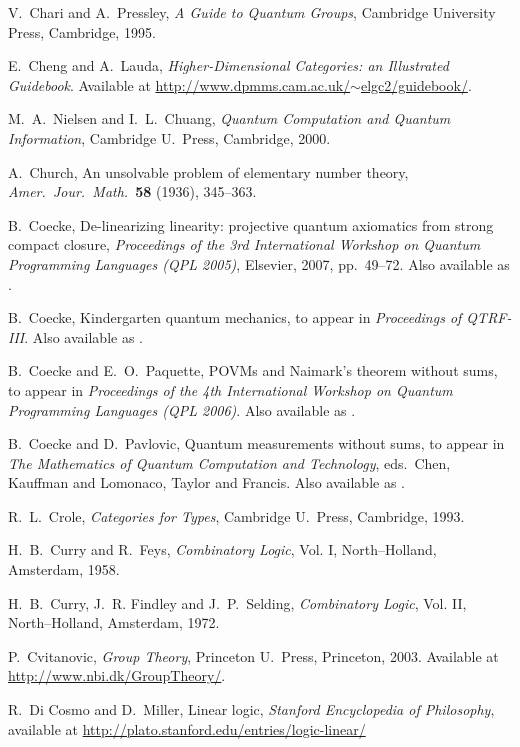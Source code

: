 \documentclass[12pt]{article}
\begin{document}
\begin{thebibliography}{99}
 V.\ Chari and A.\ Pressley, \textsl{A Guide to 
Quantum Groups}, Cambridge University Press, Cambridge, 1995.

 E.\ Cheng and A.\ Lauda, \textsl{Higher-Dimensional
Categories: an Illustrated Guidebook}.  Available at
\href{http://www.dpmms.cam.ac.uk/~elgc2/guidebook/}
{http://www.dpmms.cam.ac.uk/$\sim$elgc2/guidebook/}.

 M.\ A.\ Nielsen and I.\ L.\ Chuang,
{\sl Quantum Computation and Quantum Information}, Cambridge U.\ 
Press, Cambridge, 2000.
 
 A.\ Church, An unsolvable problem of elementary
number theory, {\sl Amer.\ Jour.\ Math.\ }{\bf 58} (1936), 345--363.

 B.\ Coecke, De-linearizing linearity: projective 
quantum axiomatics from strong compact closure, {\sl Proceedings of 
the 3rd International Workshop on Quantum Programming Languages (QPL 2005)}, 
Elsevier, 2007, pp.\ 49--72.  Also available as \quantph{0506134}.

 B.\ Coecke, Kindergarten quantum mechanics, to
appear in {\sl Proceedings of QTRF-III}.  Also available as
.

 B.\ Coecke and E.\ O.\ Paquette, POVMs and Naimark's
theorem without sums, to appear in {\sl Proceedings of the 4th
International Workshop on Quantum Programming Languages (QPL 2006)}.  
Also available as \quantph{0608072}.

 B.\ Coecke and D.\ Pavlovic, Quantum measurements without 
sums, to appear in {\sl The Mathematics of Quantum Computation and 
Technology}, eds.\ Chen, Kauffman and Lomonaco, Taylor and Francis.
Also available as \quantph{0608035}.

 R.\ L.\ Crole, {\sl Categories for Types}, Cambridge
U.\ Press, Cambridge, 1993.

 H.\ B.\ Curry and R.\ Feys, {\sl Combinatory Logic},
Vol. I, North--Holland, Amsterdam, 1958.

H.\ B.\ Curry, J.\ R. Findley and J.\ P.\ Selding, {\sl Combinatory
Logic}, Vol. II, North--Holland, Amsterdam, 1972.

 P.\ Cvitanovic, \textsl{Group Theory}, Princeton
U.\ Press, Princeton, 2003.  Available at \hfill \break
\href{http://www.nbi.dk/GroupTheory/}{
http://www.nbi.dk/GroupTheory/}.

 R.\ Di Cosmo and D.\ Miller, Linear logic,
{\sl Stanford Encyclopedia of Philosophy}, available at 
\href{http://plato.stanford.edu/entries/logic-linear/}
{http://plato.stanford.edu/entries/logic-linear/}


\end{thebibliography}
\end{document}
